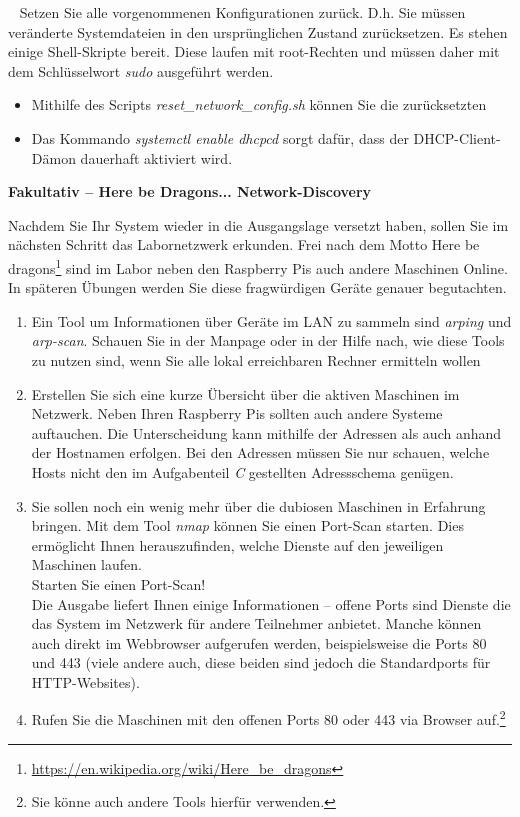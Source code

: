 \documentclass[paper=a4,fontsize=11pt]{scrartcl}%
\numberwithin{equation}{section}
\begin{document}
\begin{itemize}
\begin{tasks}
	\task~ Setzen Sie alle vorgenommenen Konfigurationen zurück. D.h. Sie müssen veränderte Systemdateien in den ursprünglichen Zustand zurücksetzen. Es stehen einige Shell-Skripte bereit. Diese laufen mit root-Rechten und müssen daher mit dem Schlüsselwort \emph{sudo} ausgeführt werden.
	\begin{itemize}
		\item Mithilfe des Scripts \emph{reset\_network\_config.sh} können Sie die  zurücksetzten
		\item Das Kommando \emph{systemctl enable dhcpcd} sorgt dafür, dass der DHCP-Client-Dämon dauerhaft aktiviert wird.
	\end{itemize}
\end{tasks}
\end{itemize}

\begin{center}\Large{\textbf{Fakultativ -- Here be Dragons... Network-Discovery}}\end{center}\vskip0.25in
Nachdem Sie Ihr System wieder in die Ausgangslage versetzt haben, sollen Sie im nächsten Schritt das Labornetzwerk erkunden. Frei nach dem Motto \glqq Here be dragons\grqq \footnote{\url{https://en.wikipedia.org/wiki/Here_be_dragons}} sind im Labor neben den Raspberry Pis auch andere Maschinen Online. In späteren Übungen werden Sie diese fragwürdigen Geräte genauer begutachten.
\begin{enumerate}
	\item Ein Tool um Informationen über Geräte im LAN zu sammeln sind \emph{arping} und \emph{arp-scan}. Schauen Sie in der Manpage oder in der Hilfe nach, wie diese Tools zu nutzen sind, wenn Sie alle lokal erreichbaren Rechner ermitteln wollen
	\item Erstellen Sie sich eine kurze Übersicht über die aktiven Maschinen im Netzwerk. Neben Ihren Raspberry Pis sollten auch andere Systeme auftauchen. Die Unterscheidung kann mithilfe der Adressen als auch anhand der Hostnamen erfolgen. Bei den Adressen müssen Sie nur schauen, welche Hosts nicht den im Aufgabenteil \emph{C} gestellten Adressschema genügen.
	\item Sie sollen noch ein wenig mehr über die dubiosen Maschinen in Erfahrung bringen. Mit dem Tool \emph{nmap} können Sie einen Port-Scan starten. Dies ermöglicht Ihnen herauszufinden, welche Dienste auf den jeweiligen Maschinen laufen.\\
	Starten Sie einen Port-Scan!\\
	Die Ausgabe liefert Ihnen einige Informationen -- offene Ports sind Dienste die das System im Netzwerk für andere Teilnehmer anbietet. Manche können auch direkt im Webbrowser aufgerufen werden, beispielsweise die Ports 80 und 443 (viele andere auch, diese beiden sind jedoch die Standardports für HTTP-Websites).
	\item Rufen Sie die Maschinen mit den offenen Ports 80 oder 443 via Browser auf.\footnote{Sie könne auch andere Tools hierfür verwenden.}
\end{enumerate}
\end{document}
